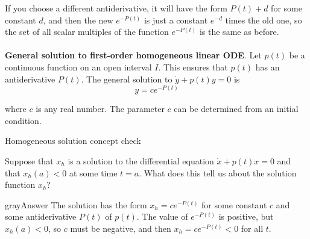 \Note If you choose a different antiderivative,
it will have the form $P(t) + d$ for some constant $d$, and then the new $\displaystyle e^{−P(t)}$ is
just a constant $\displaystyle e^{−d}$ times the old one,
so the set of all scalar multiples of the function $\displaystyle e^{−P(t)}$ is the same as before.\\
\Conclusion \\
\textbf{General solution to first-order homogeneous linear ODE}. Let $p(t)$ be a continuous
function on an open interval $I$.
This ensures that $p(t)$ has an antiderivative $P(t)$.
The general solution to $\dot y + p(t)y = 0$ is
\begin{equation*}
  y = ce^{-P(t)}
\end{equation*}

where $c$ is any real number. The parameter $c$ can be determined from an initial condition.

\begin{problem}
  Homogeneous solution concept check
\end{problem}
Suppose that $\displaystyle x_h$ is a solution to the differential equation
$\dot x + p(t)x = 0$ and that $\displaystyle x_h(a) < 0$ at some time $t=a$.
What does this tell us about the solution function $\displaystyle x_h$?
\begin{mybox}{gray}{Answer}
  The solution has the form $\displaystyle x_h=ce^{−P(t)}$ for some constant $c$
  and some antiderivative $P(t)$ of $p(t)$.
  The value of $\displaystyle e^{−P(t)}$ is positive,
  but $\displaystyle x_h(a) < 0$, so $c$ must be negative, and then
  $\displaystyle x_h = ce^{−P(t)} < 0$ for all $t$.  
\end{mybox}

